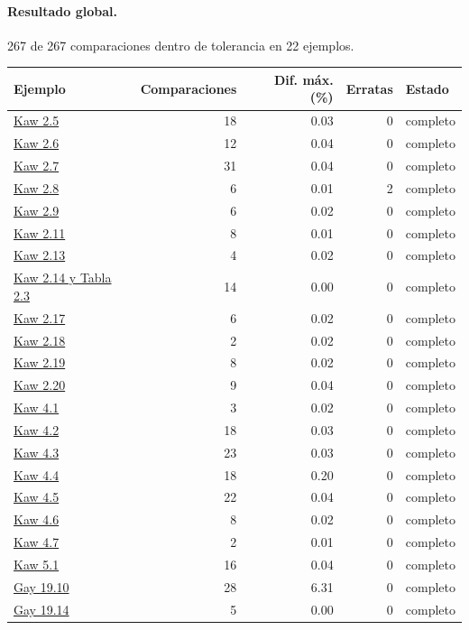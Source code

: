 \documentclass[11pt]{article}
\begin{document}
\paragraph{Resultado global.} 267 de 267 comparaciones dentro de tolerancia en 22 ejemplos.
\begin{longtable}{lrrrl}\toprule Ejemplo & Comparaciones & Dif. máx. (\%) & Erratas & Estado \\ \midrule\endhead
\hyperref[ej:kaw_2_5]{Kaw 2.5} & 18 & 0.03 & 0 & completo \\
\hyperref[ej:kaw_2_6]{Kaw 2.6} & 12 & 0.04 & 0 & completo \\
\hyperref[ej:kaw_2_7]{Kaw 2.7} & 31 & 0.04 & 0 & completo \\
\hyperref[ej:kaw_2_8]{Kaw 2.8} & 6 & 0.01 & 2 & completo \\
\hyperref[ej:kaw_2_9]{Kaw 2.9} & 6 & 0.02 & 0 & completo \\
\hyperref[ej:kaw_2_11]{Kaw 2.11} & 8 & 0.01 & 0 & completo \\
\hyperref[ej:kaw_2_13]{Kaw 2.13} & 4 & 0.02 & 0 & completo \\
\hyperref[ej:kaw_2_14]{Kaw 2.14 y Tabla 2.3} & 14 & 0.00 & 0 & completo \\
\hyperref[ej:kaw_2_17]{Kaw 2.17} & 6 & 0.02 & 0 & completo \\
\hyperref[ej:kaw_2_18]{Kaw 2.18} & 2 & 0.02 & 0 & completo \\
\hyperref[ej:kaw_2_19]{Kaw 2.19} & 8 & 0.02 & 0 & completo \\
\hyperref[ej:kaw_2_20]{Kaw 2.20} & 9 & 0.04 & 0 & completo \\
\hyperref[ej:kaw_4_1]{Kaw 4.1} & 3 & 0.02 & 0 & completo \\
\hyperref[ej:kaw_4_2]{Kaw 4.2} & 18 & 0.03 & 0 & completo \\
\hyperref[ej:kaw_4_3]{Kaw 4.3} & 23 & 0.03 & 0 & completo \\
\hyperref[ej:kaw_4_4]{Kaw 4.4} & 18 & 0.20 & 0 & completo \\
\hyperref[ej:kaw_4_5]{Kaw 4.5} & 22 & 0.04 & 0 & completo \\
\hyperref[ej:kaw_4_6]{Kaw 4.6} & 8 & 0.02 & 0 & completo \\
\hyperref[ej:kaw_4_7]{Kaw 4.7} & 2 & 0.01 & 0 & completo \\
\hyperref[ej:kaw_5_1]{Kaw 5.1} & 16 & 0.04 & 0 & completo \\
\hyperref[ej:gay_19_10]{Gay 19.10} & 28 & 6.31 & 0 & completo \\
\hyperref[ej:gay_19_14]{Gay 19.14} & 5 & 0.00 & 0 & completo \\
\bottomrule\end{longtable}
\end{document}
